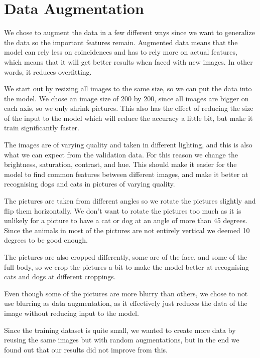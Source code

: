 \section{Data Augmentation}
We chose to augment the data in a few different ways since we want to generalize the data so the important features remain. 
Augmented data means that the model can rely less on coincidences and has to rely more on actual features, which means that it will get better results when faced with new images. In other words, it reduces overfitting.

We start out by resizing all images to the same size, so we can put the data into the model. We chose an image size of 200 by 200, since all images are bigger on each axis, so we only shrink pictures. This also has the effect of reducing the size of the input to the model which will reduce the accuracy a little bit, but make it train significantly faster.

The images are of varying quality and taken in different lighting, and this is also what we can expect from the validation data.
For this reason we change the brightness, saturation, contrast, and hue. This should make it easier for the model to find common features between different images, and make it better at recognising dogs and cats in pictures of varying quality.

The pictures are taken from different angles so we rotate the pictures slightly and flip them horizontally. We don't want to rotate the pictures too much as it is unlikely for a picture to have a cat or dog at an angle of more than 45 degrees.
Since the animals in most of the pictures are not entirely vertical we deemed 10 degrees to be good enough.

The pictures are also cropped differently, some are of the face, and some of the full body, so we crop the pictures a bit to make the model better at recognising cats and dogs at different croppings.

Even though some of the pictures are more blurry than others, we chose to not use blurring as data augmentation, as it effectively just reduces the data of the image without reducing input to the model.

Since the training dataset is quite small, we wanted to create more data by reusing the same images but with random augmentations, but in the end we found out that our results did not improve from this.